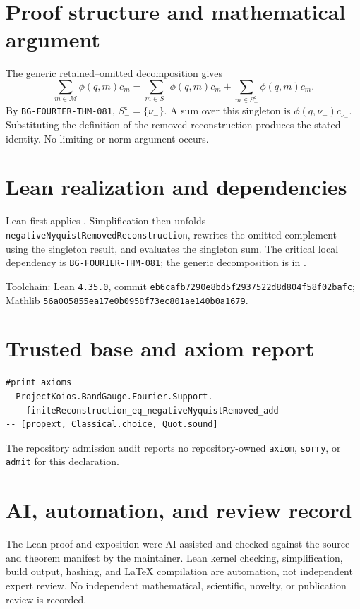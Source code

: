 \documentclass[11pt]{article}
\begin{document}
\section{Proof structure and mathematical argument}
The generic retained--omitted decomposition gives
\[
 \sum_{m\in\mathcal M}\phi(q,m)c_m
 =\sum_{m\in S_-}\phi(q,m)c_m
  +\sum_{m\in S_-^{\mathsf c}}\phi(q,m)c_m.
\]
By \texttt{BG-FOURIER-THM-081}, $S_-^{\mathsf c}=\{\nu_-\}$.  A sum over this singleton is
$\phi(q,\nu_-)c_{\nu_-}$.  Substituting the definition of the removed reconstruction produces the
stated identity.  No limiting or norm argument occurs.

\section{Lean realization and dependencies}
Lean first applies
.  Simplification then unfolds
\texttt{negativeNyquistRemovedReconstruction}, rewrites the omitted complement using the singleton
result, and evaluates the singleton sum.  The critical local dependency is
\texttt{BG-FOURIER-THM-081}; the generic decomposition is in
.

Toolchain: Lean \texttt{4.35.0}, commit
\texttt{eb6cafb7290e8bd5f2937522d8d804f58f02bafc}; Mathlib
\texttt{56a005855ea17e0b0958f73ec801ae140b0a1679}.

\section{Trusted base and axiom report}
\begin{verbatim}
#print axioms
  ProjectKoios.BandGauge.Fourier.Support.
    finiteReconstruction_eq_negativeNyquistRemoved_add
-- [propext, Classical.choice, Quot.sound]
\end{verbatim}
The repository admission audit reports no repository-owned \texttt{axiom}, \texttt{sorry}, or
\texttt{admit} for this declaration.

\section{AI, automation, and review record}
The Lean proof and exposition were AI-assisted and checked against the source and theorem manifest
by the maintainer.  Lean kernel checking, simplification, build output, hashing, and LaTeX
compilation are automation, not independent expert review.  No independent mathematical,
scientific, novelty, or publication review is recorded.
\end{document}
